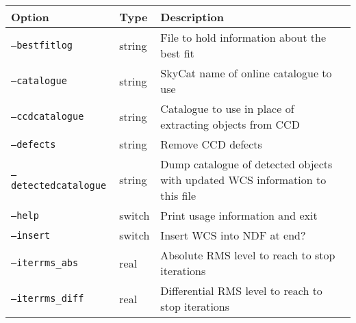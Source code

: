 \documentclass[twoside,11pt]{article}
\begin{document}
\begin{table}
\begin{center}
\begin{tabular}{l|l|p{8cm}}
Option & Type & Description \\ \hline
\texttt{--bestfitlog} & string & File to hold information about the best fit \\
\texttt{--catalogue} & string & SkyCat name of online catalogue to use \\
\texttt{--ccdcatalogue} & string & Catalogue to use in place of extracting
objects from CCD \\
\texttt{--defects} & string & Remove CCD defects \\
\texttt{--detectedcatalogue} & string & Dump catalogue of detected objects
with updated WCS information to this file \\
\texttt{--help} & switch & Print usage information and exit \\
\texttt{--insert} & switch & Insert WCS into NDF at end? \\
\texttt{--iterrms\_abs} & real & Absolute RMS level to reach to stop iterations
\\
\texttt{--iterrms\_diff} & real & Differential RMS level to reach to stop
iterations \\


\end{tabular}
\end{center}
\end{table}
\end{document}
